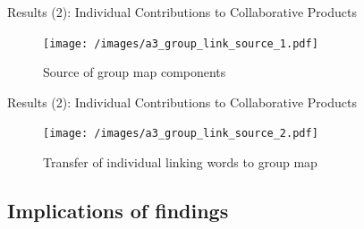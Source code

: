 \begin{frame}{Results (2): Individual Contributions to Collaborative Products}
    \begin{figure}[tb]
        \begin{center}
            \texttt{[image: /images/a3\_group\_link\_source\_1.pdf]}
        \end{center}
        \caption{Source of group map components}
        \label{group_link_s1}
    \end{figure}
\end{frame}

\begin{frame}{Results (2): Individual Contributions to Collaborative Products}
    \begin{figure}[tb]
        \begin{center}
            \texttt{[image: /images/a3\_group\_link\_source\_2.pdf]}
        \end{center}
        \caption{Transfer of individual linking words to group map}
        \label{group_link_s2}
    \end{figure}
\end{frame}

\subsection{Implications of findings}

